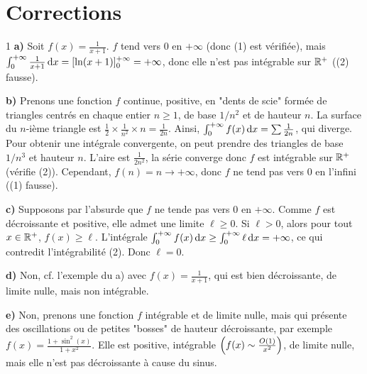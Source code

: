 \section{Corrections}

\begin{correction}{1}
\textbf{a)} Soit $f(x) = \frac{1}{x+1}$. $f$ tend vers 0 en $+\infty$ (donc (1) est vérifiée), mais $\int_0^{+\infty} \frac{1}{x+1}\,\mathrm{d}x = [\ln(x+1)]_0^{+\infty} = +\infty$, donc elle n'est pas intégrable sur $\mathbb{R}^+$ ((2) fausse).

\textbf{b)} Prenons une fonction $f$ continue, positive, en "dents de scie" formée de triangles centrés en chaque entier $n \ge 1$, de base $1/n^2$ et de hauteur $n$. La surface du $n$-ième triangle est $\frac{1}{2} \times \frac{1}{n^2} \times n = \frac{1}{2n}$. Ainsi, $\int_0^{+\infty} f(x)\,\mathrm{d}x = \sum \frac{1}{2n}$, qui diverge. Pour obtenir une intégrale convergente, on peut prendre des triangles de base $1/n^3$ et hauteur $n$. L'aire est $\frac{1}{2n^2}$, la série converge donc $f$ est intégrable sur $\mathbb{R}^+$ (vérifie (2)). Cependant, $f(n)=n \to +\infty$, donc $f$ ne tend pas vers $0$ en l'infini ((1) fausse).

\textbf{c)} Supposons par l'absurde que $f$ ne tende pas vers 0 en $+\infty$. Comme $f$ est décroissante et positive, elle admet une limite $\ell \ge 0$. Si $\ell > 0$, alors pour tout $x \in \mathbb{R}^+$, $f(x) \ge \ell$. L'intégrale $\int_0^{+\infty} f(x)\,\mathrm{d}x \ge \int_0^{+\infty} \ell \,\mathrm{d}x = +\infty$, ce qui contredit l'intégrabilité (2). Donc $\ell = 0$.

\textbf{d)} Non, cf. l'exemple du a) avec $f(x) = \frac{1}{x+1}$, qui est bien décroissante, de limite nulle, mais non intégrable.

\textbf{e)} Non, prenons une fonction $f$ intégrable et de limite nulle, mais qui présente des oscillations ou de petites "bosses" de hauteur décroissante, par exemple $f(x) = \frac{1+\sin^2(x)}{1+x^2}$. Elle est positive, intégrable $\left(f(x) \sim \frac{O(1)}{x^2}\right)$, de limite nulle, mais elle n'est pas décroissante à cause du sinus.
\end{correction}

